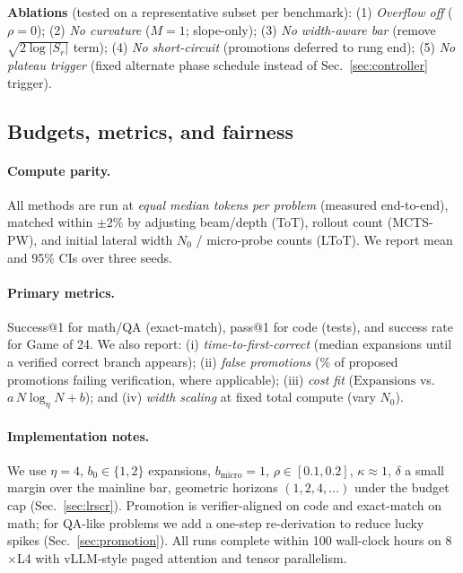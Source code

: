 \documentclass{article}
\begin{document}
\noindent\textbf{Ablations} (tested on a representative subset per benchmark):
(1) \emph{Overflow off} ($\rho{=}0$);
(2) \emph{No curvature} ($M{=}1$; slope-only);
(3) \emph{No width-aware bar} (remove $\sqrt{2\log |S_r|}$ term);
(4) \emph{No short-circuit} (promotions deferred to rung end);
(5) \emph{No plateau trigger} (fixed alternate phase schedule instead of Sec.~\ref{sec:controller} trigger).

\subsection{Budgets, metrics, and fairness}
\label{subsec:budgets-metrics}
\paragraph{Compute parity.}
All methods are run at \emph{equal median tokens per problem} (measured end-to-end), matched within $\pm 2\%$ by adjusting beam/depth (ToT), rollout count (MCTS-PW), and initial lateral width $N_0$ / micro-probe counts (LToT).
We report mean and 95\% CIs over three seeds.

\paragraph{Primary metrics.}
Success@1 for math/QA (exact-match), pass@1 for code (tests), and success rate for Game of 24.
We also report:
(i) \emph{time-to-first-correct} (median expansions until a verified correct branch appears);
(ii) \emph{false promotions} (\% of proposed promotions failing verification, where applicable);
(iii) \emph{cost fit} ($\mathrm{Expansions}$ vs.\ $a\,N\log_\eta N + b$); and
(iv) \emph{width scaling} at fixed total compute (vary $N_0$).

\paragraph{Implementation notes.}
We use $\eta{=}4$, $b_0{\in}\{1,2\}$ expansions, $b_{\text{micro}}{=}1$, $\rho{\in}[0.1,0.2]$, $\kappa{\approx}1$, $\delta$ a small margin over the mainline bar, geometric horizons $(1,2,4,\dots)$ under the budget cap (Sec.~\ref{sec:lrscr}).
Promotion is verifier-aligned on code and exact-match on math; for QA-like problems we add a one-step re-derivation to reduce lucky spikes (Sec.~\ref{sec:promotion}).
All runs complete within 100 wall-clock hours on 8$\times$L4 with vLLM-style paged attention and tensor parallelism.
\end{document}
